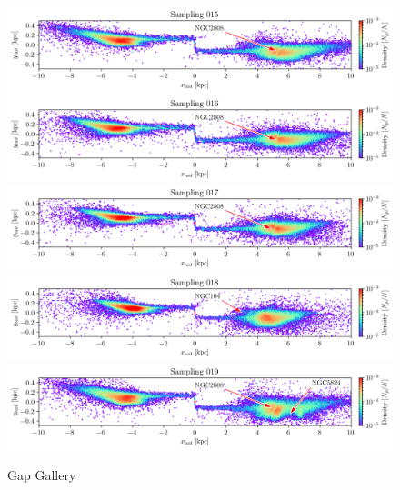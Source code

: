 \documentclass[draft]{aa}
\begin{document}
\begin{appendix}
    \begin{figure}
      \centering
      \includegraphics[width=\linewidth]{gallery_of_gaps_monte-carlo-015.png}
      \includegraphics[width=\linewidth]{gallery_of_gaps_monte-carlo-016.png}
      \includegraphics[width=\linewidth]{gallery_of_gaps_monte-carlo-017.png}
      \includegraphics[width=\linewidth]{gallery_of_gaps_monte-carlo-018.png}
      \includegraphics[width=\linewidth]{gallery_of_gaps_monte-carlo-019.png}
      \caption{Gap Gallery}
      \label{fig:TailCoordinates}
    \end{figure}        


\end{appendix}
\end{document}
